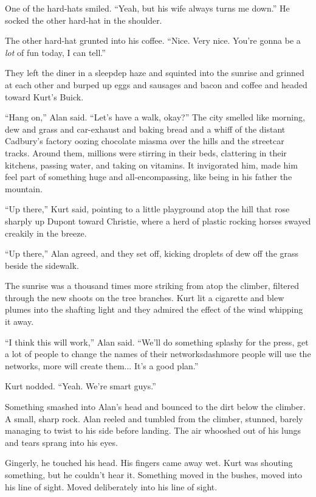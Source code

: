 One of the hard-hats smiled.  ``Yeah, but his wife always turns me
down.'' He socked the other hard-hat in the shoulder.

The other hard-hat grunted into his coffee.  ``Nice.  Very nice. 
You're gonna be a \textit{lot} of fun today, I can tell.''

They left the diner in a sleepdep haze and squinted into the sunrise
and grinned at each other and burped up eggs and sausages and bacon
and coffee and headed toward Kurt's Buick.

``Hang on,'' Alan said.  ``Let's have a walk, okay?'' The city smelled
like morning, dew and grass and car-exhaust and baking bread and a
whiff of the distant Cadbury's factory oozing chocolate miasma over
the hills and the streetcar tracks.  Around them, millions were
stirring in their beds, clattering in their kitchens, passing water,
and taking on vitamins.  It invigorated him, made him feel part of
something huge and all-encompassing, like being in his father the
mountain.

``Up there,'' Kurt said, pointing to a little playground atop the hill
that rose sharply up Dupont toward Christie, where a herd of plastic
rocking horses swayed creakily in the breeze.

``Up there,'' Alan agreed, and they set off, kicking droplets of dew
off the grass beside the sidewalk.

The sunrise was a thousand times more striking from atop the climber,
filtered through the new shoots on the tree branches.  Kurt lit a
cigarette and blew plumes into the shafting light and they admired the
effect of the wind whipping it away.

``I think this will work,'' Alan said.  ``We'll do something splashy
for the press, get a lot of people to change the names of their
networksdash{}more people will use the networks, more will create them... 
It's a good plan.''

Kurt nodded.  ``Yeah.  We're smart guys.''

Something smashed into Alan's head and bounced to the dirt below the
climber.  A small, sharp rock.  Alan reeled and tumbled from the
climber, stunned, barely managing to twist to his side before landing. 
The air whooshed out of his lungs and tears sprang into his eyes.

Gingerly, he touched his head.  His fingers came away wet.  Kurt was
shouting something, but he couldn't hear it.  Something moved in the
bushes, moved into his line of sight.  Moved deliberately into his
line of sight.

